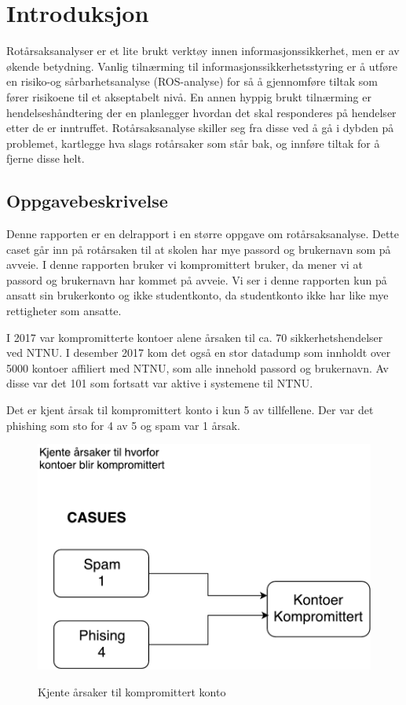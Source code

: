 \chapter{Introduksjon}
\fixme Rotårsaksanalyser er et lite brukt verktøy innen informasjonssikkerhet, men er av økende betydning. Vanlig tilnærming til informasjonssikkerhetsstyring er å utføre en risiko-og sårbarhetsanalyse (ROS-analyse) for så å gjennomføre tiltak som fører risikoene til et akseptabelt nivå. En annen hyppig brukt tilnærming er hendelseshåndtering der en planlegger hvordan det skal responderes på hendelser etter de er inntruffet. Rotårsaksanalyse skiller seg fra disse ved å gå i dybden på problemet, kartlegge hva slags rotårsaker som står bak, og innføre tiltak for å fjerne disse helt.

\section{Oppgavebeskrivelse}
Denne rapporten er en delrapport i en større oppgave om rotårsaksanalyse. Dette caset går inn på rotårsaken til at skolen har mye passord og brukernavn som på avveie. I denne rapporten bruker vi kompromittert bruker, da mener vi at passord og brukernavn har kommet på avveie. Vi ser i denne rapporten kun på ansatt sin brukerkonto og ikke studentkonto, da studentkonto ikke har like mye rettigheter som ansatte.

I 2017 var kompromitterte kontoer alene årsaken til ca. 70 sikkerhetshendelser ved NTNU. I desember 2017 kom det også en stor datadump som innholdt over 5000 kontoer affiliert med NTNU, som alle innehold passord og brukernavn. Av disse var det 101 som fortsatt var aktive i systemene til NTNU. 

Det er kjent årsak til kompromittert konto i kun 5 av tillfellene. Der var  det phishing som sto for 4 av 5 og spam var 1 årsak. 

\begin{figure}[H]
    \centering
    \includegraphics[scale=0.6]{case_2/bilder/kjente_arsaker.pdf}
    \label{fig:kjkk}
    \caption[kjente_årsaker_kompromittert_konto]{Kjente årsaker til kompromittert konto}
\end{figure}


